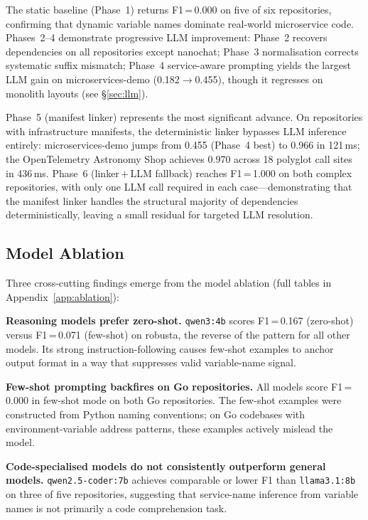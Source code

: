 \documentclass[runningheads]{llncs}
\begin{document}
The static baseline (Phase~1) returns F1\,=\,0.000 on five of six
repositories, confirming that dynamic variable names dominate real-world
microservice code. Phases~2--4 demonstrate progressive LLM improvement:
Phase~2 recovers dependencies on all repositories except nanochat;
Phase~3 normalisation corrects systematic suffix mismatch; Phase~4
service-aware prompting yields the largest LLM gain on microservices-demo
(0.182$\to$0.455), though it regresses on monolith layouts (see \S\ref{sec:llm}).

Phase~5 (manifest linker) represents the most significant advance. On
repositories with infrastructure manifests, the deterministic linker
bypasses LLM inference entirely: microservices-demo jumps from 0.455
(Phase~4 best) to 0.966 in 121\,ms; the OpenTelemetry Astronomy Shop
achieves 0.970 across 18 polyglot call sites in 436\,ms. Phase~6
(linker\,+\,LLM fallback) reaches F1\,=\,1.000 on both complex
repositories, with only one LLM call required in each case---demonstrating
that the manifest linker handles the structural majority of dependencies
deterministically, leaving a small residual for targeted LLM resolution.

\subsection{Model Ablation}
\label{sec:ablation}

Three cross-cutting findings emerge from the model ablation (full tables in
Appendix~\ref{app:ablation}):

\textbf{Reasoning models prefer zero-shot.} \texttt{qwen3:4b} scores
F1\,=\,0.167 (zero-shot) versus F1\,=\,0.071 (few-shot) on robusta, the
reverse of the pattern for all other models. Its strong instruction-following
causes few-shot examples to anchor output format in a way that suppresses
valid variable-name signal.

\textbf{Few-shot prompting backfires on Go repositories.} All models score
F1\,=\,0.000 in few-shot mode on both Go repositories. The few-shot
examples were constructed from Python naming conventions; on Go codebases
with environment-variable address patterns, these examples actively mislead
the model.

\textbf{Code-specialised models do not consistently outperform general
models.} \texttt{qwen2.5-coder:7b} achieves comparable or lower F1 than
\texttt{llama3.1:8b} on three of five repositories, suggesting that
service-name inference from variable names is not primarily a code
comprehension task.
\end{document}
